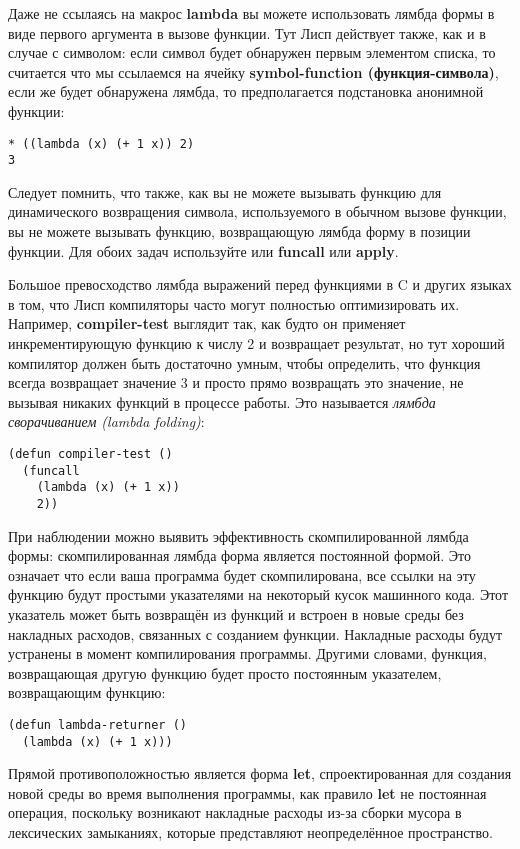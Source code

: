 Даже не ссылаясь на макрос \textbf{lambda} вы можете использовать лямбда формы в виде первого аргумента в вызове функции. Тут Лисп действует также, как и в случае с символом: если символ будет обнаружен первым элементом списка, то считается что мы ссылаемся на ячейку \textbf{symbol-function (функция-символа)}, если же будет обнаружена лямбда, то предполагается подстановка анонимной функции:

\begin{verbatim}
* ((lambda (x) (+ 1 x)) 2)
3
\end{verbatim}

Следует помнить, что также, как вы не можете вызывать функцию для динамического возвращения символа, используемого в обычном вызове функции, вы не можете вызывать функцию, возвращающую лямбда форму в позиции функции. Для обоих задач используйте или \textbf{funcall} или \textbf{apply}.

Большое превосходство лямбда выражений перед функциями в C и других языках в том, что Лисп компиляторы часто могут полностью оптимизировать их. Например, \textbf{compiler-test} выглядит так, как будто он применяет инкрементирующую функцию к числу 2 и возвращает результат, но тут хороший компилятор должен быть достаточно умным, чтобы определить, что функция всегда возвращает значение 3 и просто прямо возвращать это значение, не вызывая никаких функций в процессе работы. Это называется \emph{лямбда сворачиванием (lambda folding)}:

\begin{verbatim}
(defun compiler-test ()
  (funcall
    (lambda (x) (+ 1 x))
    2))
\end{verbatim}

При наблюдении можно выявить эффективность скомпилированной лямбда формы: скомпилированная лямбда форма является постоянной формой. Это означает что если ваша программа будет скомпилирована, все ссылки на эту функцию будут простыми указателями на некоторый кусок машинного кода. Этот указатель может быть возвращён из функций и встроен в новые среды без накладных расходов, связанных с созданием функции. Накладные расходы будут устранены в момент компилирования программы. Другими словами, функция, возвращающая другую функцию будет просто постоянным указателем, возвращающим функцию:

\begin{verbatim}
(defun lambda-returner ()
  (lambda (x) (+ 1 x)))
\end{verbatim}

Прямой противоположностью является форма \textbf{let}, спроектированная для создания новой среды во время выполнения программы, как правило \textbf{let} не постоянная операция, поскольку возникают накладные расходы из-за сборки мусора в лексических замыканиях, которые представляют неопределённое пространство.

